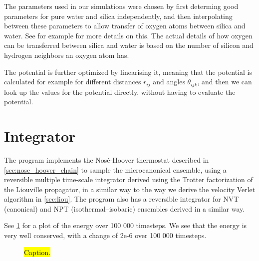 The parameters used in our simulations were chosen by first determing good parameters for pure water and silica independently, and then interpolating between these parameters to allow transfer of oxygen atoms between silica and water. See for example \cite{vashishta1990interaction} for more details on this. The actual details of how oxygen can be transferred between silica and water is based on the number of silicon and hydrogen neighbors an oxygen atom has.

The potential is further optimized by linearising it, meaning that the potential is calculated for example for different distances $r_{ij}$ and angles $\theta_{ijk}$, and then we can look up the values for the potential directly, without having to evaluate the potential.


\section{Integrator\label{sec:sio2_integrator}}

The program implements the Nos\'e-Hoover thermostat described in \cref{sec:nose_hoover_chain} to sample the microcanonical ensemble, using a reversible multiple time-scale integrator derived using the Trotter factorization of the Liouville propagator\cite{tuckerman1992reversible}, in a similar way to the way we derive the velocity Verlet algorithm in \cref{sec:liou}. The program also has a reversible integrator for NVT (canonical) and NPT (isothermal–isobaric) ensembles\cite{martyna1996explicit} derived in a similar way. 

See \cref{fig:energy_conservation_plot} for a plot of the energy over 100 000 timesteps. We see that the energy is very well conserved, with a change of 2e-6 over 100 000 timesteps.
%
\begin{figure}[htpb]%
    \centering%
    \caption{%
        \hl{Caption.}
        \label{fig:energy_conservation_plot}%
    }%
\end{figure}%

